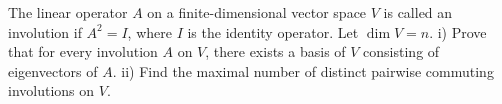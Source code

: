 The linear operator $A$ on a finite-dimensional vector space $V$ is called an involution if
$A^{2}=I$, where $I$ is the identity operator. Let $\dim V=n$.
i) Prove that for every involution $A$ on $V$, there exists a basis of $V$ consisting of eigenvectors
of $A$.
ii) Find the maximal number of distinct pairwise commuting involutions on $V$.